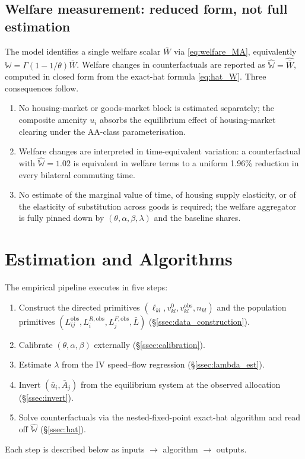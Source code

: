 \documentclass[12pt]{article}
\newcommand{\Lbar}{\bar L}
\newcommand{\Wbar}{\bar W}
\newcommand{\ubar}{\bar u}
\newcommand{\Abar}{\bar A}
\newcommand{\obs}{\mathrm{obs}}
\begin{document}
\subsection{Welfare measurement: reduced form, not full estimation}
\label{ssec:welfare_strategy}

The model identifies a single welfare scalar $\Wbar$ via
\eqref{eq:welfare_MA}, equivalently
$\mathbb W=\Gamma(1-1/\theta)\Wbar$.  Welfare changes in
counterfactuals are reported as $\hat{\mathbb W}=\hat{\Wbar}$,
computed in closed form from the exact-hat formula
\eqref{eq:hat_W}.  Three consequences follow.
\begin{enumerate}[label=(\roman*),leftmargin=2em,itemsep=0.2em]
\item No housing-market or goods-market block is estimated
  separately; the composite amenity $u_i$ absorbs the equilibrium
  effect of housing-market clearing under the AA-class
  parameterisation.
\item Welfare changes are interpreted in time-equivalent variation:
  a counterfactual with $\hat{\mathbb W}=1.02$ is equivalent in
  welfare terms to a uniform 1.96\% reduction in every bilateral
  commuting time.
\item No estimate of the marginal value of time, of housing supply
  elasticity, or of the elasticity of substitution across goods is
  required; the welfare aggregator is fully pinned down by
  $(\theta,\alpha,\beta,\lambda)$ and the baseline shares.
\end{enumerate}

\section{Estimation and Algorithms}\label{sec:est}

The empirical pipeline executes in five steps:
\begin{enumerate}[label=\textbf{Step \arabic*.},leftmargin=3.5em,itemsep=0.2em]
\item Construct the directed primitives
  $(\ell_{kl},v^{0}_{kl},v_{kl}^{\obs},n_{kl})$ and the population
  primitives $(L_{ij}^{\obs},L_i^{R,\obs},L_j^{F,\obs},\Lbar)$
  (\S\ref{ssec:data_construction}).
\item Calibrate $(\theta,\alpha,\beta)$ externally
  (\S\ref{ssec:calibration}).
\item Estimate $\lambda$ from the IV speed--flow regression
  (\S\ref{ssec:lambda_est}).
\item Invert $(\ubar_i,\Abar_j)$ from the equilibrium system at the
  observed allocation (\S\ref{ssec:invert}).
\item Solve counterfactuals via the nested-fixed-point exact-hat
  algorithm and read off $\hat{\mathbb W}$ (\S\ref{ssec:hat}).
\end{enumerate}
Each step is described below as inputs $\to$ algorithm $\to$ outputs.
\end{document}
